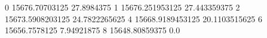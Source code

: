 0 15676.70703125 27.8984375
1 15676.251953125 27.443359375
2 15673.5908203125 24.7822265625
4 15668.9189453125 20.1103515625
6 15656.7578125 7.94921875
8 15648.80859375 0.0
